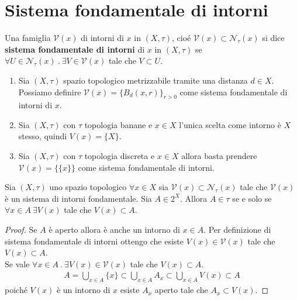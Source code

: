 \section{Sistema fondamentale di intorni}

\begin{definition}
	Una famiglia $\mathcal{V}(x)$ di intorni di $x$ in $(X,\tau)$, cioé $\mathcal{V}(x) \subset \mathcal{N}_\tau(x)$ si dice \textbf{sistema fondamentale di intorni} di $x$ in $(X,\tau)$ se $\forall U \in \mathcal{N}_\tau(x)\ .\ \exists V \in \mathcal{V}(x)$ tale che $V \subset U$.
\end{definition}

\begin{example}
\begin{enumerate}
	\item Sia $(X,\tau)$ spazio topologico metrizzabile tramite una distanza $d \in X$. Possiamo definire $\mathcal{V}(x) = \{B_d(x,r)\}_{r>0}$ come sistema fondamentale di intorni di $x$. 
	\item Sia $(X,\tau)$ con $\tau$ topologia banane e $x \in X$ l'unica scelta come intorno è $X$ stesso, quindi $V(x) = \{X\}$.
	\item Sia $(X,\tau)$ con $\tau$ topologia discreta e $x \in X$ allora basta prendere $\mathcal{V}(x) = \{\{x\}\}$ come sistema fondamentale di intorni.
\end{enumerate}
\end{example}

\begin{proposition}
	Sia $(X,\tau)$ uno spazio topologico $\forall x \in X$ sia $\mathcal{V}(x) \subset \mathcal{N}_\tau(x)$ tale che $\mathcal{V}(x)$ è un sistema di intorni fondamentale. Sia $A \in 2^X$. Allora $A \in \tau$ se e solo se $\forall x \in A\ \exists V(x)$ tale che $V(x) \subset A$.
\end{proposition}
\begin{proof}
	Se $A$ è aperto allora è anche un intorno di $x \in A$. Per definizione di sistema fondamentale di intorni ottengo che esiste $V(x) \in \mathcal{V}(x)$ tale che $V(x) \subset A$.\\
	
	Se vale $\forall x \in A\ .\ \exists V(x) \in \mathcal{V}(x)$ tale che $V(x) \subset A$. 
	\begin{equation}
	\begin{aligned}
		A = \bigcup_{x \in A} \{x\} \subset \bigcup_{x \in A} A_x \subset \bigcup_{x \in A} V(x) \subset A
	\end{aligned}
	\end{equation}
	poiché $V(x)$ è un intorno di $x$ esiste $A_x$ aperto tale che $A_x \subset V(x)$.
\end{proof}

